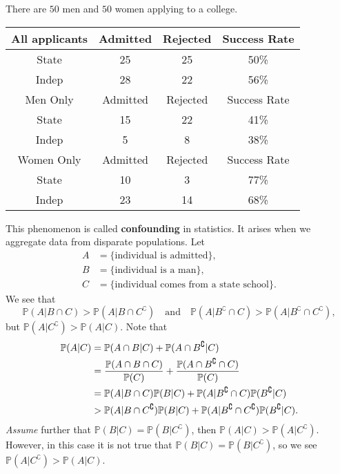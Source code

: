 \begin{example}
    There are $50$ men and $50$ women applying to a college.
    \begin{center}
        \begin{tabular}{|c|c|c|c|}
            \hline
            All applicants&Admitted&Rejected&Success Rate\\
            \hline
            State&25&25&50\%\\
            Indep&28&22&56\%\\
            \hline
            Men Only&Admitted&Rejected&Success Rate\\
            \hline
            State&15&22&41\%\\
            Indep&5&8&38\%\\
            \hline
            Women Only&Admitted&Rejected&Success Rate\\
            \hline
            State&10&3&77\%\\
            Indep&23&14&68\%\\ 
            \hline
        \end{tabular}
    \end{center}
    This phenomenon is called \textbf{confounding} in statistics. It arises when we aggregate data from disparate populations. Let 
    \begin{align*}
        A &= \{\text{individual is admitted}\} , \\
        B &= \{\text{individual is a man}\}, \\
        C &= \{\text{individual comes from a state school}\}.
    \end{align*}
    We see that 
    \[
        \mathbb{P}(A|B \cap C)>\mathbb{P}(A|B \cap C^\complement)\quad \text{and}\quad \mathbb{P}(A|B^\complement \cap C)> \mathbb{P}(A| B^\complement \cap C^\complement),
    \]
    but $ \mathbb{P}(A|C^\complement)>\mathbb{P}(A|C) $. Note that
    \begin{align*}
        \mathbb{P}(A|C) &= \mathbb{P}(A \cap B|C)+\mathbb{P}(A \cap B^\complement|C)\\ 
        &= \frac{{\mathbb{P}}(A\cap B\cap C)}{{\mathbb{P}}(C)}+\frac{{\mathbb{P}}(A\cap B^\complement\cap C)}{{\mathbb{P}}(C)}\\ 
        &= \mathbb{P}(A|B\cap C)\mathbb{P}(B|C)+\mathbb{P}(A|B^\complement \cap C)\mathbb{P}(B^\complement|C)\\ 
        &> \mathbb{P}(A|B\cap C^\complement)\mathbb{P}(B|C)+\mathbb{P}(A|B^\complement \cap C^\complement)\mathbb{P}(B^\complement|C).
    \end{align*}
    \textit{Assume} further that $ \mathbb{P}(B|C) = \mathbb{P}(B|C^\complement) $, then $ \mathbb{P}(A|C)>\mathbb{P}(A|C^\complement) $. However, in this case it is not true that $ \mathbb{P}(B|C) = \mathbb{P}(B|C^\complement) $, so we see $ \mathbb{P}(A|C^\complement)>\mathbb{P}(A|C) $.
\end{example}